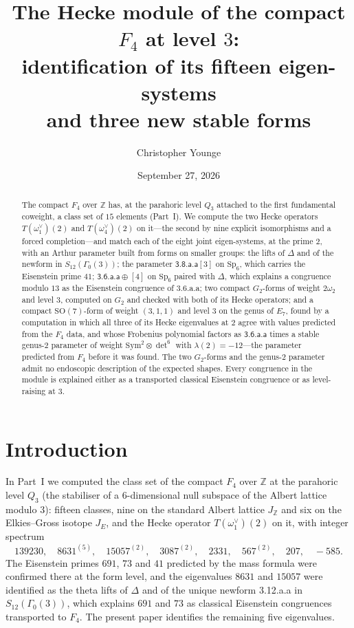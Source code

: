 \documentclass[11pt]{amsart}
\title[The Hecke module of the compact $F_4$ at level 3]{The Hecke module of the compact $F_4$ at level $3$:\\ identification of its fifteen eigen-systems\\ and three new stable forms}
\author{Christopher Younge}\thanks{Working draft, not for circulation.}
\date{September 27, 2026}
\theoremstyle{definition}
\newcommand{\Z}{\mathbb{Z}}\newcommand{\Q}{\mathbb{Q}}\newcommand{\R}{\mathbb{R}}\newcommand{\A}{\mathbb{A}}\newcommand{\F}{\mathbb{F}}
\begin{document}
\begin{abstract}
The compact $F_4$ over $\Z$ has, at the parahoric level $Q_3$ attached to the first fundamental coweight, a class set of $15$ elements (Part~I). We compute the two Hecke operators $T(\omega_1^\vee)(2)$ and $T(\omega_4^\vee)(2)$ on it---the second by nine explicit isomorphisms and a forced completion---and match each of the eight joint eigen-systems, at the prime $2$, with an Arthur parameter built from forms on smaller groups: the lifts of $\Delta$ and of the newform in $S_{12}(\Gamma_0(3))$; the parameter $\textsf{3.8.a.a}[3]$ on $\mathrm{Sp}_6$, which carries the Eisenstein prime $41$; $\textsf{3.6.a.a}\oplus[4]$ on $\mathrm{Sp}_6$ paired with $\Delta$, which explains a congruence modulo $13$ as the Eisenstein congruence of \textsf{3.6.a.a}; two compact $G_2$-forms of weight $2\omega_2$ and level $3$, computed on $G_2$ and checked with both of its Hecke operators; and a compact $\mathrm{SO}(7)$-form of weight $(3,1,1)$ and level $3$ on the genus of $E_7$, found by a computation in which all three of its Hecke eigenvalues at $2$ agree with values predicted from the $F_4$ data, and whose Frobenius polynomial factors as $\textsf{3.6.a.a}$ times a stable genus-$2$ parameter of weight $\mathrm{Sym}^2\otimes\det^6$ with $\lambda(2)=-12$---the parameter predicted from $F_4$ before it was found. The two $G_2$-forms and the genus-$2$ parameter admit no endoscopic description of the expected shapes. Every congruence in the module is explained either as a transported classical Eisenstein congruence or as level-raising at $3$.
\end{abstract}
\maketitle
\section{Introduction}
In Part~I \cite{PartI} we computed the class set of the compact $F_4$ over $\Z$ at the parahoric level $Q_3$ (the stabiliser of a $6$-dimensional null subspace of the Albert lattice modulo $3$): fifteen classes, nine on the standard Albert lattice $J_\Z$ and six on the Elkies--Gross isotope $J_E$, and the Hecke operator $T(\omega_1^\vee)(2)$ on it, with integer spectrum
\[139230,\quad 8631^{(5)},\quad 15057^{(2)},\quad 3087^{(2)},\quad 2331,\quad 567^{(2)},\quad 207,\quad -585.\]
The Eisenstein primes $691$, $73$ and $41$ predicted by the mass formula were confirmed there at the form level, and the eigenvalues $8631$ and $15057$ were identified as the theta lifts of $\Delta$ and of the unique newform \textsf{3.12.a.a} in $S_{12}(\Gamma_0(3))$, which explains $691$ and $73$ as classical Eisenstein congruences transported to $F_4$. The present paper identifies the remaining five eigenvalues.
\end{document}
